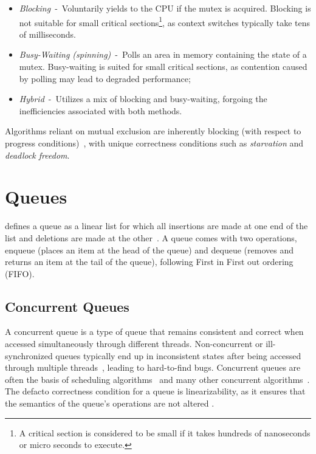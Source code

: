 \begin{itemize}
\item \emph{Blocking}~-~Voluntarily yields to the CPU
if the mutex is acquired. Blocking is not suitable for small critical
sections\footnote{A critical section is considered to be small if it takes
hundreds of nanoseconds or micro seconds to execute.}, as context switches typically take tens of milliseconds.
\item \emph{Busy-Waiting (spinning)}~-~Polls an area in memory
containing the state of a mutex. Busy-waiting is suited for small
critical sections, as contention caused by polling may lead to degraded
performance;
\item \emph{Hybrid}~-~Utilizes a mix of blocking and busy-waiting, forgoing the
inefficiencies associated with both methods.
\end{itemize}

Algorithms reliant on mutual exclusion are inherently
blocking (with respect to progress conditions)~\citep[Section~3.8]{herlihy2020art}, with
unique correctness conditions such as \emph{starvation} and \emph{deadlock
freedom}.


\section{Queues}
\citeauthor{knuth1968art} defines a queue as a linear list for which all
insertions are made at one end of the list and deletions are made at the
other~\citep{knuth1968art}. A queue comes with two operations, enqueue (places
an item at the head of the queue) and dequeue (removes and returns an item at
the tail of the queue), following First in First out ordering (FIFO).


\subsection{Concurrent Queues}
A concurrent queue is a type of queue that remains consistent and correct when
accessed simultaneously through different threads. Non-concurrent or
ill-synchronized queues typically end up in inconsistent states after being
accessed through multiple threads~\citep{yahav2003automatically}, leading
to hard-to-find bugs. Concurrent queues are often the basis of scheduling
algorithms~\citep{debattista2002high} and many other concurrent
algorithms~\citep{yahav2003automatically}. The defacto correctness condition
for a queue is linearizability, as it ensures that the semantics of the queue's
operations are not altered \citep{mellor1987concurrent, valois1995datastructures}.

